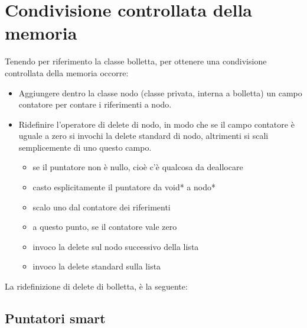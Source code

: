 \section{Condivisione controllata della memoria}
Tenendo per riferimento la classe bolletta, per ottenere una condivisione controllata della memoria occorre:
\begin{itemize}
	\item Aggiungere dentro la classe nodo (classe privata, interna a bolletta) un campo contatore per contare i riferimenti a nodo.
	\item Ridefinire l'operatore di delete di nodo, in modo che se il campo contatore è uguale a zero si invochi la delete standard di nodo, altrimenti si scali semplicemente di uno questo campo.
	\begin{itemize}
		\item se il puntatore non è nullo, cioè c'è qualcosa da deallocare
		\item casto esplicitamente il puntatore da void* a nodo*
		\item scalo uno dal contatore dei riferimenti
		\item a questo punto, se il contatore vale zero
		\item invoco la delete sul nodo successivo della lista
		\item invoco la delete standard sulla lista
	\end{itemize}	
\end{itemize}
La ridefinizione di delete di bolletta, è la seguente:


\subsection{Puntatori smart}